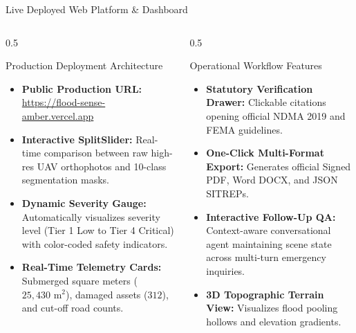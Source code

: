 \documentclass[aspectratio=169, 10pt, professionalfonts]{beamer}
\begin{document}
\begin{frame}{Live Deployed Web Platform \& Dashboard}
  \begin{columns}[T]
    \begin{column}{0.5\textwidth}
      \begin{block}{Production Deployment Architecture}
        \begin{itemize}\setlength{\itemsep}{0.4em}\footnotesize
          \item \textbf{Public Production URL:} \url{https://flood-sense-amber.vercel.app}
          \item \textbf{Interactive SplitSlider:} Real-time comparison between raw high-res UAV orthophotos and 10-class segmentation masks.
          \item \textbf{Dynamic Severity Gauge:} Automatically visualizes severity level (Tier 1 Low to Tier 4 Critical) with color-coded safety indicators.
          \item \textbf{Real-Time Telemetry Cards:} Submerged square meters ($25,430\text{ m}^2$), damaged assets ($312$), and cut-off road counts.
        \end{itemize}
      \end{block}
    \end{column}
    
    \begin{column}{0.5\textwidth}
      \begin{block}{Operational Workflow Features}
        \begin{itemize}\setlength{\itemsep}{0.4em}\footnotesize
          \item \textbf{Statutory Verification Drawer:} Clickable citations opening official NDMA 2019 and FEMA guidelines.
          \item \textbf{One-Click Multi-Format Export:} Generates official Signed PDF, Word DOCX, and JSON SITREPs.
          \item \textbf{Interactive Follow-Up QA:} Context-aware conversational agent maintaining scene state across multi-turn emergency inquiries.
          \item \textbf{3D Topographic Terrain View:} Visualizes flood pooling hollows and elevation gradients.
        \end{itemize}
      \end{block}
    \end{column}
  \end{columns}
\end{frame}
\end{document}
